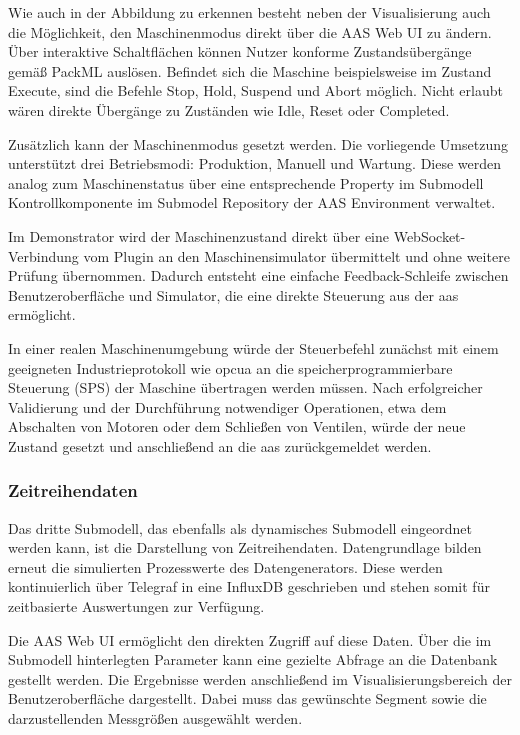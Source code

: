 Wie auch in der Abbildung zu erkennen besteht neben der Visualisierung auch die Möglichkeit, den Maschinenmodus direkt über die AAS Web UI zu ändern. 
Über interaktive Schaltflächen können Nutzer konforme Zustandsübergänge gemäß PackML auslösen. 
Befindet sich die Maschine beispielsweise im Zustand Execute, sind die Befehle Stop, Hold, Suspend und Abort möglich. 
Nicht erlaubt wären direkte Übergänge zu Zuständen wie Idle, Reset oder Completed.

Zusätzlich kann der Maschinenmodus gesetzt werden. 
Die vorliegende Umsetzung unterstützt drei Betriebsmodi: Produktion, Manuell und Wartung. 
Diese werden analog zum Maschinenstatus über eine entsprechende Property im Submodell Kontrollkomponente im Submodel Repository der AAS Environment verwaltet.

Im Demonstrator wird der Maschinenzustand direkt über eine WebSocket-Verbindung vom Plugin an den Maschinensimulator übermittelt und ohne weitere Prüfung übernommen. 
Dadurch entsteht eine einfache Feedback-Schleife zwischen Benutzeroberfläche und Simulator, die eine direkte Steuerung aus der \acs{aas} ermöglicht.

In einer realen Maschinenumgebung würde der Steuerbefehl zunächst mit einem geeigneten Industrieprotokoll wie \acs{opcua} an die speicherprogrammierbare Steuerung (SPS) der Maschine übertragen werden müssen. 
Nach erfolgreicher Validierung und der Durchführung notwendiger Operationen, etwa dem Abschalten von Motoren oder dem Schließen von Ventilen, würde der neue Zustand gesetzt und anschließend an die \acs{aas} zurückgemeldet werden.

\subsubsection*{Zeitreihendaten}
\vspace{-0.5em}
Das dritte Submodell, das ebenfalls als dynamisches Submodell eingeordnet werden kann, ist die Darstellung von Zeitreihendaten. 
Datengrundlage bilden erneut die simulierten Prozesswerte des Datengenerators.
Diese werden kontinuierlich über Telegraf in eine InfluxDB geschrieben und stehen somit für zeitbasierte Auswertungen zur Verfügung.

Die AAS Web UI ermöglicht den direkten Zugriff auf diese Daten. 
Über die im Submodell hinterlegten Parameter kann eine gezielte Abfrage an die Datenbank gestellt werden. 
Die Ergebnisse werden anschließend im Visualisierungsbereich der Benutzeroberfläche dargestellt. 
Dabei muss das gewünschte Segment sowie die darzustellenden Messgrößen ausgewählt werden.

